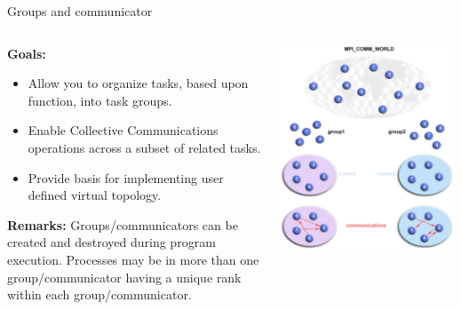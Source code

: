 \documentclass[aspectratio=43]{beamer}
\begin{document}
\begin{frame}[fragile]{Groups and communicator}
\begin{columns}
\begin{column}{0.5\paperwidth}
\textbf{Goals:}
\begin{itemize}
\item Allow you to organize tasks, based upon function, into task groups.
\item Enable Collective Communications operations across a subset of related tasks.
\item Provide basis for implementing user defined virtual topology.
\end{itemize}
\textbf{Remarks:}
Groups/communicators can be created and destroyed during program execution.
Processes may be in more than one group/communicator having a unique rank within each group/communicator.
\end{column}
\begin{column}{0.5\paperwidth}
\includegraphics[scale=0.36]{05.MPI_Topo/world.pdf}
\end{column}
\end{columns}
\end{frame}
\end{document}
